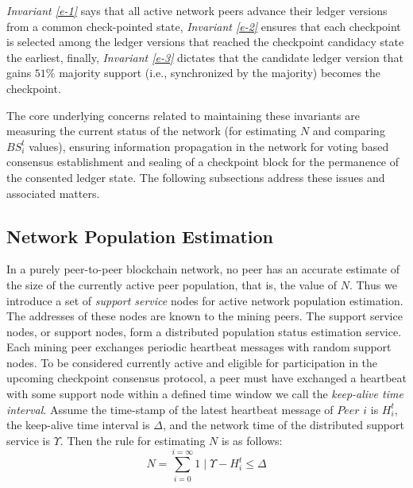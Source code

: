 \textit{Invariant \ref{e-1}} says that all active network peers advance their ledger versions from a common check-pointed state, \textit{Invariant \ref{e-2}} ensures that each checkpoint is selected among the ledger versions that reached the checkpoint candidacy state the earliest, finally, \textit{Invariant \ref{e-3}} dictates that the candidate ledger version that gains $51\%$ majority support (i.e., synchronized by the majority) becomes the checkpoint. 

The core underlying concerns related to maintaining these invariants are measuring the current status of the network (for estimating $N$ and comparing $BS_i^t$ values), ensuring information propagation in the network for voting based consensus establishment and sealing of a checkpoint block for the permanence of the consented ledger state. The following subsections address these issues and associated matters.    

\subsection{Network Population Estimation}
In a purely peer-to-peer blockchain network, no peer has an accurate estimate of the size of the currently active peer population, that is, the value of $N$. Thus we introduce a set of \textit{support service} nodes for active network population estimation. The addresses of these nodes are known to the mining peers. The support service nodes, or support nodes, form a distributed population status estimation service. Each mining peer exchanges periodic heartbeat messages with random support nodes. To be considered currently active and eligible for participation in the upcoming checkpoint consensus protocol, a peer must have exchanged a heartbeat with some support node within a defined time window we call the \textit{keep-alive time interval}. Assume the time-stamp of the latest heartbeat message of $Peer$ $i$ is $H_i^t$, the keep-alive time interval is $\Delta$, and the network time of the distributed support service is $\Upsilon$. Then the rule for estimating $N$ is as follows:  
\begin{equation}
\label{e-4}
N = \sum_{i = 0}^{i = \infty}{1 \mid \Upsilon - H_i^t \leq \Delta}
\end{equation}

